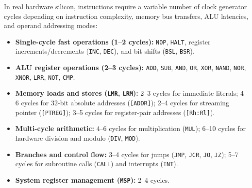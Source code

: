 \documentclass[11pt,a4paper]{article}
\begin{document}
In real hardware silicon, instructions require a variable number of clock generator cycles depending on instruction complexity, memory bus transfers, ALU latencies, and operand addressing modes:
\begin{itemize}[leftmargin=10pt,itemsep=1.5pt]
    \item \textbf{Single-cycle fast operations (1--2 cycles):} \texttt{NOP}, \texttt{HALT}, register increments/decrements (\texttt{INC}, \texttt{DEC}), and bit shifts (\texttt{BSL}, \texttt{BSR}).
    \item \textbf{ALU register operations (2--3 cycles):} \texttt{ADD}, \texttt{SUB}, \texttt{AND}, \texttt{OR}, \texttt{XOR}, \texttt{NAND}, \texttt{NOR}, \texttt{XNOR}, \texttt{LRR}, \texttt{NOT}, \texttt{CMP}.
    \item \textbf{Memory loads and stores (\texttt{LMR}, \texttt{LRM}):} 2--3 cycles for immediate literals; 4--6 cycles for 32-bit absolute addresses (\texttt{[ADDR]}); 2--4 cycles for streaming pointer (\texttt{[PTREG]}); 3--5 cycles for register-pair addresses (\texttt{[Rh:Rl]}).
    \item \textbf{Multi-cycle arithmetic:} 4--6 cycles for multiplication (\texttt{MUL}); 6--10 cycles for hardware division and modulo (\texttt{DIV}, \texttt{MOD}).
    \item \textbf{Branches and control flow:} 3--4 cycles for jumps (\texttt{JMP}, \texttt{JCR}, \texttt{JO}, \texttt{JZ}); 5--7 cycles for subroutine calls (\texttt{CALL}) and interrupts (\texttt{INT}).
    \item \textbf{System register management (\texttt{MSP}):} 2--4 cycles.
\end{itemize}
\end{document}
